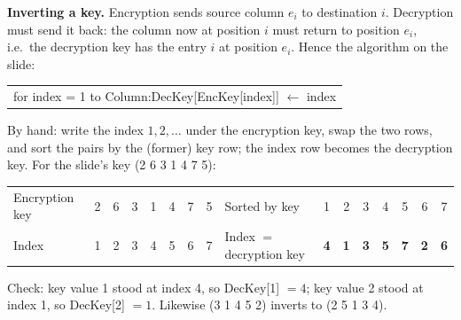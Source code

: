 \textbf{Inverting a key.} Encryption sends source column $e_i$ to destination $i$. Decryption must send it back: the column now at position $i$ must return to position $e_i$, i.e.\ the decryption key has the entry $i$ at position $e_i$. Hence the algorithm on the slide:
\begin{center}\small\ttfamily
\begin{tabular}{@{}l@{}}
for index = 1 to Column:\quad DecKey[EncKey[index]] $\leftarrow$ index
\end{tabular}
\end{center}
By hand: write the index $1, 2, \dots$ under the encryption key, swap the two rows, and sort the pairs by the (former) key row; the index row becomes the decryption key. For the slide's key (2 6 3 1 4 7 5):
\begin{center}\small
\begin{tabular}{@{}l*{7}{c}@{\qquad}l*{7}{c}@{}}
\toprule
Encryption key & 2&6&3&1&4&7&5 & Sorted by key & 1&2&3&4&5&6&7\\
Index & 1&2&3&4&5&6&7 & Index $=$ decryption key & \textbf{4}&\textbf{1}&\textbf{3}&\textbf{5}&\textbf{7}&\textbf{2}&\textbf{6}\\
\bottomrule
\end{tabular}
\end{center}
Check: key value 1 stood at index 4, so DecKey[1] $= 4$; key value 2 stood at index 1, so DecKey[2] $= 1$. Likewise (3 1 4 5 2) inverts to (2 5 1 3 4).

